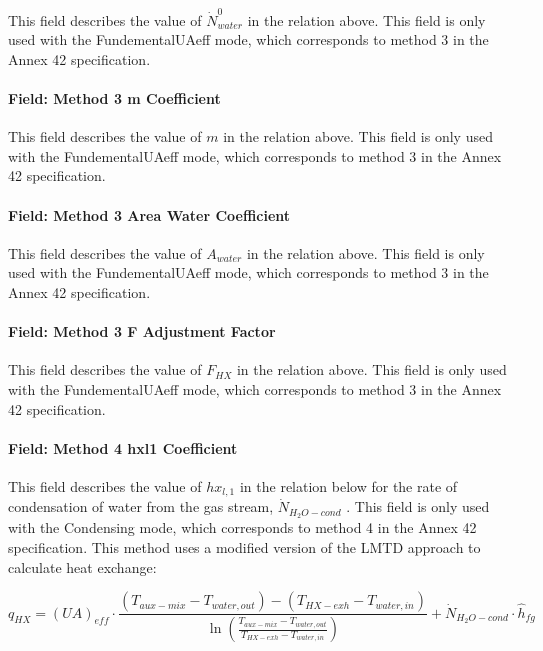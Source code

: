 This field describes the value of \(\dot N_{water}^0\) in the relation above. This field is only used with the FundementalUAeff mode, which corresponds to method 3 in the Annex 42 specification.

\paragraph{Field: Method 3 m Coefficient}\label{field-method-3-m-coefficient}

This field describes the value of \(m\) in the relation above. This field is only used with the FundementalUAeff mode, which corresponds to method 3 in the Annex 42 specification.

\paragraph{Field: Method 3 Area Water Coefficient}\label{field-method-3-area-water-coefficient}

This field describes the value of \({A_{water}}\) in the relation above. This field is only used with the FundementalUAeff mode, which corresponds to method 3 in the Annex 42 specification.

\paragraph{Field: Method 3 F Adjustment Factor}\label{field-method-3-f-adjustment-factor}

This field describes the value of \({F_{HX}}\) in the relation above. This field is only used with the FundementalUAeff mode, which corresponds to method 3 in the Annex 42 specification.

\paragraph{Field: Method 4 hxl1 Coefficient}\label{field-method-4-hxl1-coefficient}

This field describes the value of \(h{x_{l,1}}\) in the relation below for the rate of condensation of water from the gas stream, \({\dot N_{{H_2}O - cond}}\) . This field is only used with the Condensing mode, which corresponds to method 4 in the Annex 42 specification. This method uses a modified version of the LMTD approach to calculate heat exchange:

\begin{equation}
{q_{HX}} = {\left( {UA} \right)_{eff}} \cdot \frac{{\left( {{T_{aux - mix}} - {T_{water,out}}} \right) - \left( {{T_{HX - exh}} - {T_{water,in}}} \right)}}{{\ln \left( {\frac{{{T_{aux - mix}} - {T_{water,out}}}}{{{T_{HX - exh}} - {T_{water,in}}}}} \right)}} + {\dot N_{{H_2}O - cond}} \cdot {\hat h_{fg}}
\end{equation}

